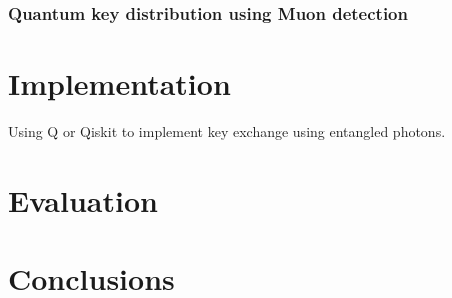 \documentclass{article}
\begin{document}
\subsubsection{Quantum key distribution using Muon detection }

\section{Implementation}

Using Q or Qiskit to implement key exchange using entangled photons.

\section{Evaluation}

\section{Conclusions}

\printbibliography
\end{document}
